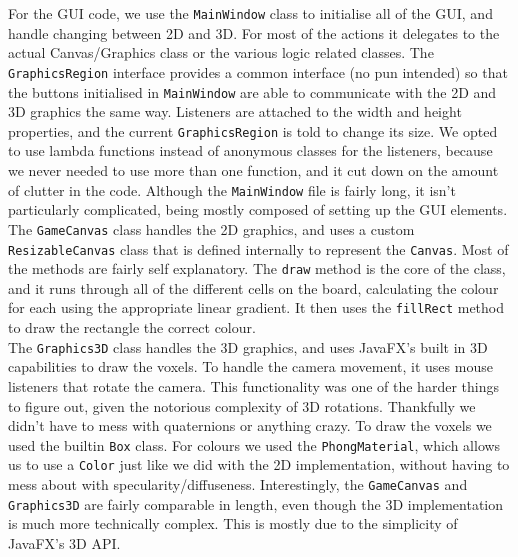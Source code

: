\documentclass[11pt]{article}
\begin{document}
For the GUI code, we use the \texttt{MainWindow} class to initialise all of the GUI, and
handle changing between 2D and 3D.  For most of the actions it delegates to the
actual Canvas/Graphics class or the various logic related classes.  The
\texttt{GraphicsRegion} interface provides a common interface (no pun intended) so that the
buttons initialised in \texttt{MainWindow} are able to communicate with the 2D and 3D
graphics the same way.  Listeners are attached to the width and height
properties, and the current \texttt{GraphicsRegion} is told to change its size.  We opted
to use lambda functions instead of anonymous classes for the listeners, because
we never needed to use more than one function, and it cut down on the amount of
clutter in the code.  Although the \texttt{MainWindow} file is fairly long, it isn't
particularly complicated, being mostly composed of setting up the GUI
elements.\\

The \texttt{GameCanvas} class handles the 2D graphics, and uses a custom \texttt{ResizableCanvas}
class that is defined internally to represent the \texttt{Canvas}.   Most of the methods
are fairly self explanatory.  The \texttt{draw} method is the core of the class, and it
runs through all of the different cells on the board, calculating the colour for
each using the appropriate linear gradient.  It then uses the \texttt{fillRect} method to
draw the rectangle the correct colour.\\

The \texttt{Graphics3D} class handles the 3D graphics, and uses JavaFX's built in 3D
capabilities to draw the voxels.  To handle the camera movement, it uses mouse
listeners that rotate the camera.  This functionality was one of the harder
things to figure out, given the notorious complexity of 3D rotations.
Thankfully we didn't have to mess with quaternions or anything crazy.  To draw
the voxels we used the builtin \texttt{Box} class.  For colours we  used the
\texttt{PhongMaterial}, which allows us to use a \texttt{Color} just like we did with the 2D
implementation, without having to mess about with specularity/diffuseness.
Interestingly, the \texttt{GameCanvas} and \texttt{Graphics3D} are fairly comparable in length,
even though the 3D implementation is much more technically complex.  This is
mostly due to the simplicity of JavaFX's 3D API.\\
\end{document}
